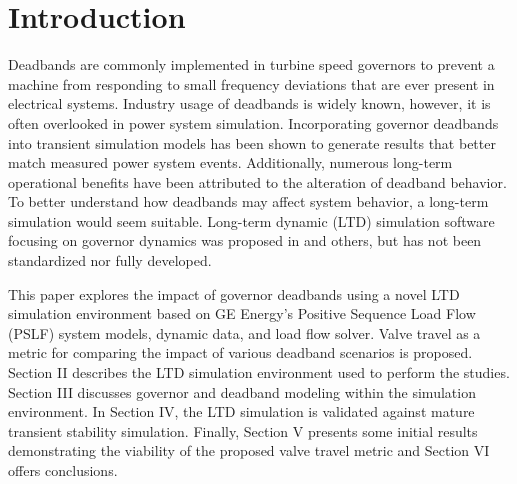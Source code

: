 \section{Introduction}
Deadbands are commonly implemented in turbine speed governors to prevent a machine from responding to small frequency deviations that are ever present in electrical systems.
Industry usage of deadbands is widely known, however, it is often overlooked in power system simulation.
Incorporating governor deadbands into transient simulation models has been shown to generate results that better match measured power system events\cite{kou2016}.
Additionally, numerous long-term operational benefits have been attributed to the alteration of deadband behavior\cite{nercFRI2012}.
To better understand how deadbands may affect system behavior, a long-term simulation would seem suitable.
Long-term dynamic (LTD) simulation software focusing on governor dynamics was proposed in \cite{AGCCresap} and others, but has not been standardized nor fully developed.


This paper explores the impact of governor deadbands using a novel LTD simulation environment based on GE Energy's Positive Sequence Load Flow (PSLF) system models, dynamic data, and load flow solver. 
Valve travel as a metric for comparing the impact of various deadband scenarios is proposed. 
Section II describes the LTD simulation environment used to perform the studies. 
Section III discusses governor and deadband modeling within the simulation environment. 
In Section IV, the LTD simulation is validated against mature transient stability simulation. 
Finally, Section V presents some initial results demonstrating the viability of the proposed valve travel metric and Section VI offers conclusions.
